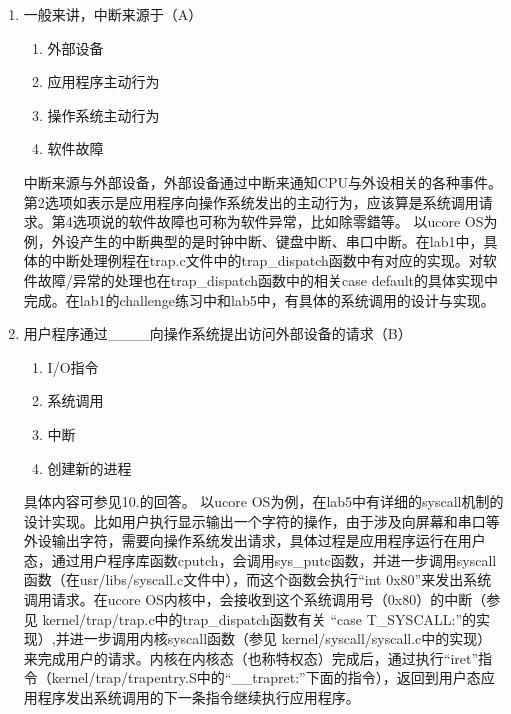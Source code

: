 \begin{enumerate}
\item 一般来讲，中断来源于（A）
\begin{enumerate}[A]
	\item 外部设备
	\item 应用程序主动行为
	\item 操作系统主动行为
	\item 软件故障
\end{enumerate}
中断来源与外部设备，外部设备通过中断来通知CPU与外设相关的各种事件。第2选项如表示是应用程序向操作系统发出的主动行为，应该算是系统调用请求。第4选项说的软件故障也可称为软件异常，比如除零錯等。 以ucore OS为例，外设产生的中断典型的是时钟中断、键盘中断、串口中断。在lab1中，具体的中断处理例程在trap.c文件中的trap\_dispatch函数中有对应的实现。对软件故障/异常的处理也在trap\_dispatch函数中的相关case default的具体实现中完成。在lab1的challenge练习中和lab5中，有具体的系统调用的设计与实现。

\item 用户程序通过\_\_\_\_向操作系统提出访问外部设备的请求（B）
\begin{enumerate}[A]
	\item I/O指令
	\item 系统调用
	\item 中断
	\item 创建新的进程
\end{enumerate}
具体内容可参见10.的回答。 以ucore OS为例，在lab5中有详细的syscall机制的设计实现。比如用户执行显示输出一个字符的操作，由于涉及向屏幕和串口等外设输出字符，需要向操作系统发出请求，具体过程是应用程序运行在用户态，通过用户程序库函数cputch，会调用sys\_putc函数，并进一步调用syscall函数（在usr/libs/syscall.c文件中），而这个函数会执行“int 0x80”来发出系统调用请求。在ucore OS内核中，会接收到这个系统调用号（0x80）的中断（参见 kernel/trap/trap.c中的trap\_dispatch函数有关 “case T\_SYSCALL:”的实现）,并进一步调用内核syscall函数（参见 kernel/syscall/syscall.c中的实现）来完成用户的请求。内核在内核态（也称特权态）完成后，通过执行“iret”指令（kernel/trap/trapentry.S中的“\_\_trapret:”下面的指令），返回到用户态应用程序发出系统调用的下一条指令继续执行应用程序。


\end{enumerate}
